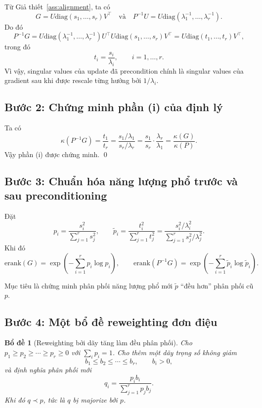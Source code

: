 \documentclass[11pt,a4paper]{article}
\newtheorem{lemma}{Bổ đề}
\newcommand{\erank}{\mathrm{erank}}
\newcommand{\diag}{\mathrm{diag}}
\begin{document}
Từ Giả thiết~\ref{ass:alignment}, ta có
\[
G = U\diag(s_1,\ldots,s_r)V^\top
\quad \text{và} \quad
P^{-1}U = U\diag(\lambda_1^{-1},\ldots,\lambda_r^{-1}).
\]
Do đó
\[
P^{-1}G
= U\diag(\lambda_1^{-1},\ldots,\lambda_r^{-1})U^\top U\diag(s_1,\ldots,s_r)V^\top
= U\diag(t_1,\ldots,t_r)V^\top,
\]
trong đó
\[
t_i = \frac{s_i}{\lambda_i}, \qquad i=1,\ldots,r.
\]
Vì vậy, singular values của update đã precondition chính là singular values của gradient sau khi được rescale từng hướng bởi $1/\lambda_i$.

\subsection{Bước 2: Chứng minh phần (i) của định lý}

Ta có
\[
\kappa(P^{-1}G) = \frac{t_1}{t_r}
= \frac{s_1/\lambda_1}{s_r/\lambda_r}
= \frac{s_1}{s_r}\cdot\frac{\lambda_r}{\lambda_1}
= \frac{\kappa(G)}{\kappa(P)}.
\]
Vậy phần (i) được chứng minh. \qed

\subsection{Bước 3: Chuẩn hóa năng lượng phổ trước và sau preconditioning}

Đặt
\[
p_i = \frac{s_i^2}{\sum_{j=1}^r s_j^2},
\qquad
\tilde p_i = \frac{t_i^2}{\sum_{j=1}^r t_j^2}
= \frac{s_i^2/\lambda_i^2}{\sum_{j=1}^r s_j^2/\lambda_j^2}.
\]
Khi đó
\[
\erank(G) = \exp\!\left(-\sum_{i=1}^r p_i\log p_i\right),
\qquad
\erank(P^{-1}G) = \exp\!\left(-\sum_{i=1}^r \tilde p_i\log \tilde p_i\right).
\]

Mục tiêu là chứng minh phân phối năng lượng phổ mới $\tilde p$ ``đều hơn'' phân phối cũ $p$.

\subsection{Bước 4: Một bổ đề reweighting đơn điệu}

\begin{lemma}[Reweighting bởi dãy tăng làm đều phân phối]
\label{lem:reweight_majorization}
Cho $p_1 \ge p_2 \ge \cdots \ge p_r \ge 0$ với $\sum_i p_i = 1$. Cho thêm một dãy trọng số không giảm
\[
b_1 \le b_2 \le \cdots \le b_r, \qquad b_i > 0,
\]
và định nghĩa phân phối mới
\[
q_i = \frac{p_i b_i}{\sum_{j=1}^r p_j b_j}.
\]
Khi đó $q \prec p$, tức là $q$ bị majorize bởi $p$.
\end{lemma}
\end{document}
